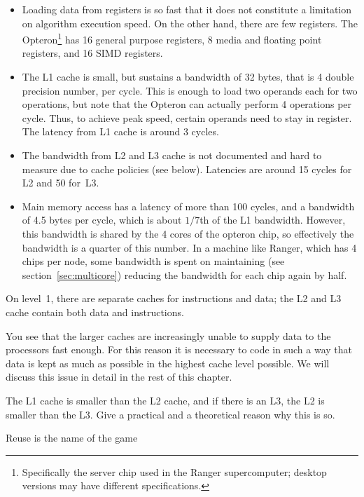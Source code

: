 \begin{itemize}
\item Loading data from registers is so fast that it does not
  constitute a limitation on algorithm execution speed. On the other
  hand, there are few registers. The Opteron\footnote{Specifically the
    server chip used in the Ranger supercomputer; desktop versions
    may have different specifications.} has 16 general purpose
  registers, 8 media and floating point registers, and 16 SIMD
  registers.
\item The L1 cache is small, but sustains a bandwidth of 32 bytes,
  that is 4 double precision number, per cycle. This is enough to load
  two operands each for two operations, but note that the Opteron can
  actually perform 4 operations per cycle. Thus, to achieve peak
  speed, certain operands need to stay in register. The latency from
  L1 cache is around 3 cycles.
\item The bandwidth from L2 and L3 cache is not documented and hard to
  measure due to cache policies (see below). Latencies are around 15
  cycles for L2 and 50 for~L3.
\item Main memory access has a latency of more than 100 cycles, and a
  bandwidth of 4.5 bytes per cycle, which is about $1/7$th of the L1
  bandwidth. However, this bandwidth is shared by the 4 cores of the
  opteron chip, so effectively the bandwidth is a quarter of this
  number. In a machine like Ranger, which has 4 chips per node,
  some bandwidth is spent on maintaining  (see
  section~\ref{sec:multicore}) reducing the bandwidth for each chip
  again by half.
\end{itemize}

On level~1, there are separate caches for instructions and data; the
L2 and L3 cache contain both data and instructions.

You see that the larger caches are increasingly unable to supply data
to the processors fast enough. For this reason it is necessary to code
in such a way that data is kept as much as possible in the highest
cache level possible. We will discuss this issue in detail in the rest
of this chapter.

\begin{exercise}
  The L1 cache is smaller than the L2 cache, and if there is an L3,
  the L2 is smaller than the L3. Give a practical and a theoretical
  reason why this is so.  
\end{exercise}

 {Reuse is the name of the game}

